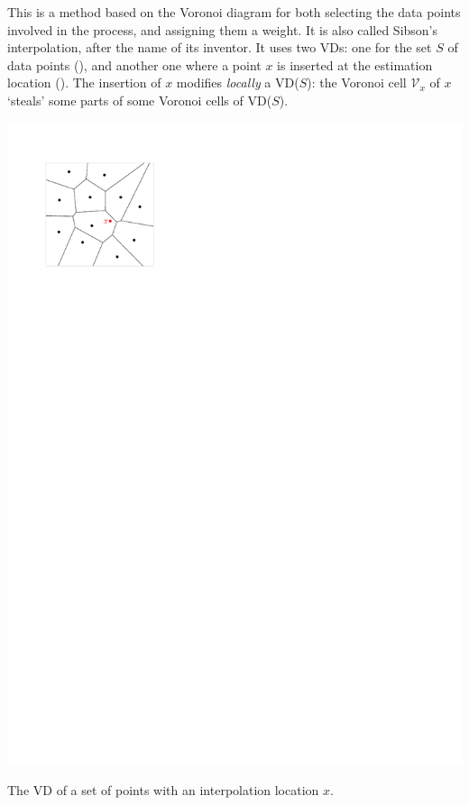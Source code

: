 This is a method based on the Voronoi diagram for both selecting the data points involved in the process, and assigning them a weight.  
It is also called Sibson's interpolation, after the name of its inventor.
It uses two VDs: one for the set $S$ of data points (), and another one where a point $x$ is inserted at the estimation location (). 
The insertion of $x$ modifies \emph{locally} a VD($S$): the Voronoi cell $\mathcal{V}_{x}$ of $x$ `steals' some parts of some Voronoi cells of VD($S$).

\begin{marginfigure}
  \centering
  \includegraphics[width=\textwidth,page=1]{figs/laplace.pdf}%
  \caption{The VD of a set of points with an interpolation location $x$.}%
\end{marginfigure}
